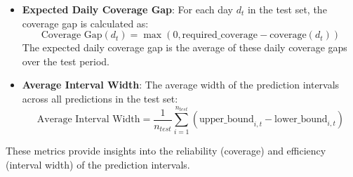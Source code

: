 \begin{itemize}
\item \textbf{Expected Daily Coverage Gap}: For each day $d_t$ in the test set, the coverage gap is calculated as:
$$\text{Coverage Gap}(d_t) = \max(0, \text{required\_coverage} - \text{coverage}(d_t))$$
The expected daily coverage gap is the average of these daily coverage gaps over the test period.
\item \textbf{Average Interval Width}: The average width of the prediction intervals across all predictions in the test set:
$$\text{Average Interval Width} = \frac{1}{n_{test}} \sum_{i=1}^{n_{test}} (\text{upper\_bound}_{i,t} - \text{lower\_bound}_{i,t})$$
\end{itemize}

These metrics provide insights into the reliability (coverage) and efficiency (interval width) of the prediction intervals.

